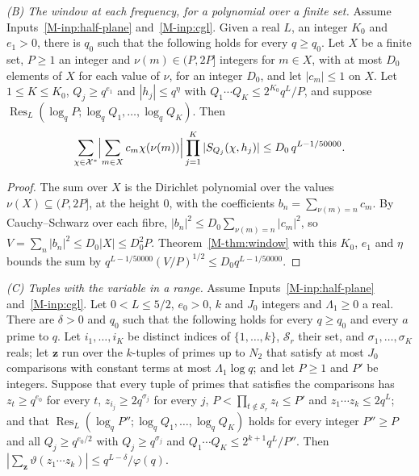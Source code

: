 \documentclass[11pt]{article}
\numberwithin{equation}{section}
\begin{document}
\emph{(B) The window at each frequency, for a polynomial over a finite set.} Assume Inputs~\ref{M-inp:half-plane}
and~\ref{M-inp:cgl}. Given a real $L$, an integer $K_0$ and $e_1 > 0$, there is $q_0$ such that the following holds for
every $q \ge q_0$. Let $X$ be a finite set, $P \ge 1$ an integer and $\nu(m) \in (P, 2P]$ integers for $m \in X$, with
at most $D_0$ elements of $X$ for each value of $\nu$, for an integer $D_0$, and let $|c_m| \le 1$ on $X$. Let $1 \le
K \le K_0$, $Q_j \ge q^{e_1}$ and $|h_j| \le q^\eta$ with $Q_1
\cdots Q_K \le 2^{K_0} q^L/P$, and suppose $\operatorname{Res}_L(\log_q P; \log_q Q_1, \dots, \log_q Q_K)$. Then
\[
  \sum_{\chi \in \mathcal X^*} \Bigl|\sum_{m \in X} c_m \chi(\nu(m))\Bigr| \prod_{j = 1}^K |S_{Q_j}(\chi, h_j)|
  \le D_0 \, q^{L - 1/50000}.
\]

\begin{proof}
The sum over $X$ is the Dirichlet polynomial over the values $\nu(X) \subseteq (P, 2P]$, at the height $0$, with the
coefficients $b_n = \sum_{\nu(m) = n} c_m$. By Cauchy--Schwarz over each fibre, $|b_n|^2 \le D_0 \sum_{\nu(m) = n}
|c_m|^2$, so $V = \sum_n |b_n|^2 \le D_0 |X| \le D_0^2 P$. Theorem~\ref{M-thm:window} with this $K_0$, $e_1$ and $\eta$
bounds the sum by $q^{L - 1/50000} (V/P)^{1/2} \le D_0 q^{L - 1/50000}$.
\end{proof}

\emph{(C) Tuples with the variable in a range.} Assume Inputs~\ref{M-inp:half-plane} and~\ref{M-inp:cgl}. Let $0 < L
\le 5/2$, $e_0 > 0$, $k$ and $J_0$ integers and $\Lambda_1 \ge 0$ a real. There are $\delta > 0$ and $q_0$ such that
the following holds for every $q \ge q_0$ and every $a$ prime to $q$. Let $i_1, \dots, i_K$ be distinct indices of
$\{1, \dots, k\}$, $\mathcal S_r$ their set, and $\sigma_1, \dots, \sigma_K$ reals; let $\mathbf z$ run over the
$k$-tuples of primes up to $N_2$ that satisfy at most $J_0$ comparisons with constant terms at most $\Lambda_1 \log
q$; and let $P \ge 1$ and $P'$ be integers. Suppose that every tuple of primes that satisfies the comparisons has $z_t
\ge q^{e_0}$ for every $t$, $z_{i_j} \ge 2q^{\sigma_j}$ for every $j$, $P < \prod_{t \notin \mathcal S_r} z_t \le P'$
and $z_1 \cdots z_k \le 2q^L$; and that $\operatorname{Res}_L(\log_q P''; \log_q Q_1, \dots, \log_q Q_K)$ holds for
every integer $P'' \ge P$ and all $Q_j \ge q^{e_0/2}$ with $Q_j \ge q^{\sigma_j}$ and $Q_1 \cdots Q_K \le 2^{k + 1}
q^L/P''$. Then $|\sum_{\mathbf z} \vartheta(z_1 \cdots z_k)| \le q^{L - \delta}/\varphi(q)$.
\end{document}
